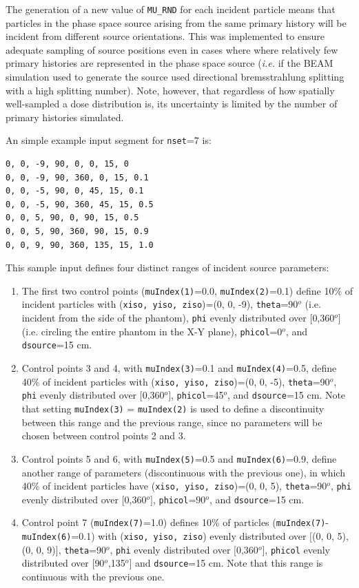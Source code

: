 \documentclass[12pt,twoside]{article}      %
\begin{document}
The generation of a new value of {\tt MU\_RND} for each incident particle means that particles in the phase space source arising
from the same primary history will be incident from different source orientations.  This was implemented to ensure adequate sampling
of source positions even in cases where where relatively few primary histories are represented in the phase space source
({\it i.e.} if the BEAM simulation used to generate the source used directional bremsstrahlung splitting with a high
splitting number).  Note, however, that regardless of how spatially well-sampled a dose distribution is, its uncertainty is
limited by the number of primary histories simulated.

An simple example input segment for {\tt nset}=7 is:

\begin{verbatim}
0, 0, -9, 90, 0, 0, 15, 0
0, 0, -9, 90, 360, 0, 15, 0.1
0, 0, -5, 90, 0, 45, 15, 0.1
0, 0, -5, 90, 360, 45, 15, 0.5
0, 0, 5, 90, 0, 90, 15, 0.5
0, 0, 5, 90, 360, 90, 15, 0.9
0, 0, 9, 90, 360, 135, 15, 1.0
\end{verbatim}

This sample input defines
four distinct ranges of incident source parameters:

\begin{enumerate}
\item The first two control points ({\tt muIndex(1)}=0.0, {\tt muIndex(2)}=0.1) define 10\% of incident particles
with ({\tt xiso, yiso, ziso})=(0, 0, -9), {\tt theta}=90$^o$ (i.e. incident
from the side of the phantom), {\tt phi} evenly distributed over $[$0,360$^o]$ (i.e. circling the entire phantom in the X-Y plane), {\tt phicol}=0$^o$, and {\tt dsource}=15 cm.
\item Control points 3 and 4, with {\tt muIndex(3)}=0.1 and {\tt muIndex(4)}=0.5, define 40\% of incident particles with
({\tt xiso, yiso, ziso})=(0, 0, -5), {\tt theta}=90$^o$, {\tt phi} evenly distributed over $[$0,360$^o]$, {\tt phicol}=45$^o$, and {\tt dsource}=15 cm.  Note that setting {\tt muIndex(3)} = {\tt muIndex(2)} is used to define a discontinuity between
this range and the previous range, since no parameters will be chosen between control points 2 and 3.
\item Control points 5 and 6, with {\tt muIndex(5)}=0.5 and {\tt muIndex(6)}=0.9, define another range of parameters
(discontinuous with the previous one), in which 40\% of incident particles have
({\tt xiso, yiso, ziso})=(0, 0, 5), {\tt theta}=90$^o$, {\tt phi} evenly distributed over $[$0,360$^o]$, {\tt phicol}=90$^o$, and
{\tt dsource}=15 cm.
\item Control point 7 ({\tt muIndex(7)}=1.0) defines 10\% of particles ({\tt muIndex(7)}-{\tt muIndex(6)}=0.1) with
({\tt xiso, yiso, ziso}) evenly distributed over $[$(0, 0, 5),(0, 0, 9)$]$, {\tt theta}=90$^o$, {\tt phi} evenly distributed over $[$0,360$^o]$, {\tt phicol} evenly distributed over $[$90$^o$,135$^o]$ and {\tt dsource}=15 cm.  Note that this range is
continuous with the previous one.
\end{enumerate}
\end{document}
